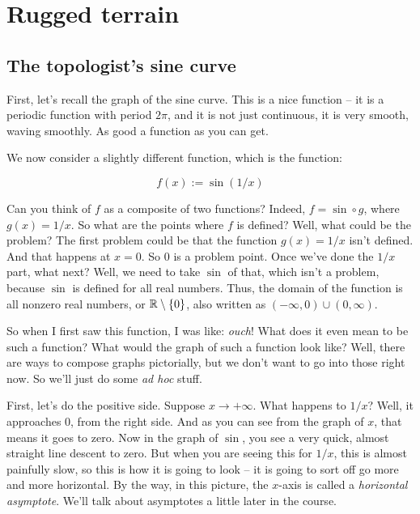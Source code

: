 \documentclass[10pt]{amsart}
\begin{document}
\section{Rugged terrain}

\subsection{The topologist's sine curve}

First, let's recall the graph of the sine curve. This is a
nice function -- it is a periodic function with period $2\pi$, and it
is not just continuous, it is very smooth, waving smoothly. As good a
function as you can get.

We now consider a slightly different function, which is the function:

\begin{equation*}
  f(x) := \sin(1/x)
\end{equation*}

Can you think of $f$ as a composite of two functions? Indeed, $f =
\sin \circ g$, where $g(x) = 1/x$. So what are the points where $f$ is
defined? Well, what could be the problem? The first problem could be
that the function $g(x) = 1/x$ isn't defined. And that happens at $x =
0$. So $0$ is a problem point. Once we've done the $1/x$ part, what
next? Well, we need to take $\sin$ of that, which isn't a problem,
because $\sin$ is defined for all real numbers. Thus, the domain of
the function is all nonzero real numbers, or $\mathbb{R} \setminus \{0 \}$,
also written as $(-\infty,0) \cup (0,\infty)$.

So when I first saw this function, I was like: {\em ouch}! What does
it even mean to be such a function? What would the graph of such a
function look like? Well, there are ways to compose graphs
pictorially, but we don't want to go into those right now. So we'll
just do some {\em ad hoc} stuff.

First, let's do the positive side. Suppose $x \to +\infty$. What
happens to $1/x$? Well, it approaches $0$, from the right side. And as
you can see from the graph of $x$, that means it goes to zero. Now in
the graph of $\sin$, you see a very quick, almost straight line
descent to zero. But when you are seeing this for $1/x$, this is
almost painfully slow, so this is how it is going to look -- it is
going to sort off go more and more horizontal. By the way, in this
picture, the $x$-axis is called a {\em horizontal asymptote}. We'll
talk about asymptotes a little later in the course.
\end{document}
